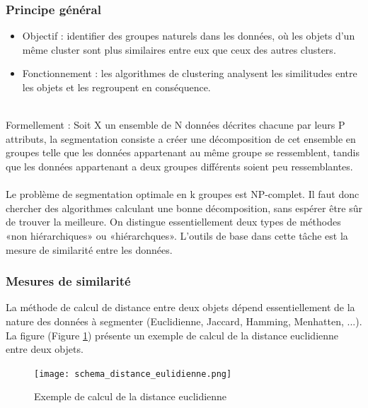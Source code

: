 \documentclass[a4paper,12pt]{report}
\begin{document}
        \subsubsection*{Principe général}
        
        \begin{itemize}
            \item  Objectif : identifier des groupes naturels dans les données, où les objets d’un même cluster sont plus similaires entre eux que ceux des autres clusters.
            \item  Fonctionnement : les algorithmes de clustering analysent les similitudes entre les objets et les regroupent en conséquence.
        \end{itemize}
        {\\}
        Formellement : Soit X un ensemble de N données décrites chacune par leurs P
        attributs, la segmentation consiste a créer une décomposition de cet ensemble
        en groupes telle que les données appartenant au même groupe se ressemblent,
        tandis que les données appartenant a deux groupes différents soient peu
        ressemblantes.{\\}{\\}
        Le problème de segmentation optimale en k groupes est NP-complet. Il faut
        donc chercher des algorithmes calculant une bonne décomposition, sans
        espérer être sûr de trouver la meilleure. On distingue essentiellement deux 
        types de méthodes «non hiérarchiques» ou «hiérarchques».
        L’outils de base dans cette tâche est la mesure de similarité entre les données.
        
        \subsubsection*{Mesures de similarité}

        La méthode de calcul de distance entre deux objets dépend essentiellement de
        la nature des données à segmenter (Euclidienne, Jaccard, Hamming,
        Menhatten, ...). La figure (Figure \ref{fig:distance_eulidienne}) présente un exemple de calcul de la distance
        euclidienne entre deux objets.
            
        \begin{figure}[h]
            \centering
            \texttt{[image: schema\_distance\_eulidienne.png]}
            \caption{Exemple de calcul de la distance euclidienne}
            \label{fig:distance_eulidienne}
        \end{figure}
\end{document}

